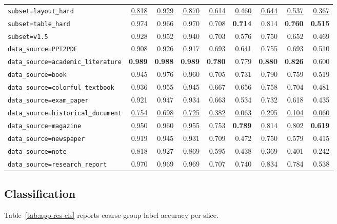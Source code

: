 \begin{table}[H]
{\begin{tabular}{@{}l rrrr rrrr@{}}
    \texttt{subset=layout\_hard} & \underline{0.818} & \underline{0.929} & \underline{0.870} & \underline{0.614} & \underline{0.460} & \underline{0.644} & \underline{0.537} & \underline{0.367} \\
    \texttt{subset=table\_hard} & 0.974 & 0.966 & 0.970 & 0.708 & \textbf{0.714} & 0.814 & \textbf{0.760} & \textbf{0.515} \\
    \texttt{subset=v1.5} & 0.928 & 0.952 & 0.940 & 0.703 & 0.576 & 0.750 & 0.652 & 0.469 \\
    \midrule
    \texttt{data\_source=PPT2PDF} & 0.908 & 0.926 & 0.917 & 0.693 & 0.641 & 0.755 & 0.693 & 0.510 \\
    \texttt{data\_source=academic\_literature} & \textbf{0.989} & \textbf{0.988} & \textbf{0.989} & \textbf{0.780} & 0.779 & \textbf{0.880} & \textbf{0.826} & 0.600 \\
    \texttt{data\_source=book} & 0.945 & 0.976 & 0.960 & 0.705 & 0.731 & 0.790 & 0.759 & 0.519 \\
    \texttt{data\_source=colorful\_textbook} & 0.936 & 0.955 & 0.945 & 0.667 & 0.656 & 0.758 & 0.704 & 0.481 \\
    \texttt{data\_source=exam\_paper} & 0.921 & 0.947 & 0.934 & 0.663 & 0.534 & 0.732 & 0.618 & 0.435 \\
    \texttt{data\_source=historical\_document} & \underline{0.754} & \underline{0.698} & \underline{0.725} & \underline{0.382} & \underline{0.063} & \underline{0.295} & \underline{0.104} & \underline{0.060} \\
    \texttt{data\_source=magazine} & 0.950 & 0.960 & 0.955 & 0.753 & \textbf{0.789} & 0.814 & 0.802 & \textbf{0.619} \\
    \texttt{data\_source=newspaper} & 0.919 & 0.945 & 0.931 & 0.709 & 0.472 & 0.750 & 0.579 & 0.415 \\
    \texttt{data\_source=note} & 0.818 & 0.927 & 0.869 & 0.595 & 0.438 & 0.369 & 0.401 & 0.242 \\
    \texttt{data\_source=research\_report} & 0.970 & 0.969 & 0.969 & 0.707 & 0.740 & 0.834 & 0.784 & 0.538 \\
\bottomrule
\end{tabular}%
}
\end{table}

\subsection{Classification}

Table~\ref{tab:app-res-cls} reports coarse-group label accuracy per slice.


